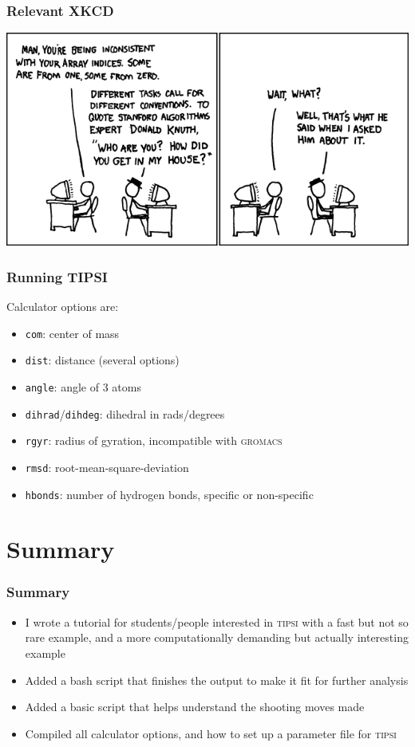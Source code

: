 \documentclass[hyperref={pdfpagelabels=false}]{beamer}
\begin{document}
\begin{frame}
\frametitle{Relevant XKCD}
\begin{center}
\includegraphics[scale=4]{images/donald_knuth.png}
\end{center}
\end{frame}

\begin{frame}
\frametitle{Running \textsc{TIPSI}} 
Calculator options are:
\begin{itemize}
\item \texttt{com}: center of mass
\item \texttt{dist}: distance (several options)
\item \texttt{angle}: angle of 3 atoms
\item \texttt{dihrad}/\texttt{dihdeg}: dihedral in rads/degrees
\item \texttt{rgyr}: radius of gyration, incompatible with \textsc{gromacs}
\item \texttt{rmsd}: root-mean-square-deviation
\item \texttt{hbonds}: number of hydrogen bonds, specific or non-specific
\end{itemize}
\end{frame}

\section{Summary}
\setcounter{subsection}{1}

\begin{frame}
\frametitle{Summary} 
\begin{itemize}
\item I wrote a tutorial for students/people interested in \textsc{tipsi} with a fast but not so rare example, and a more computationally demanding but actually interesting example
\item Added a bash script that finishes the output to make it fit for further analysis
\item Added a basic script that helps understand the shooting moves made
\item Compiled all calculator options, and how to set up a parameter file for \textsc{tipsi}
\end{itemize}
\end{frame}
\end{document}
